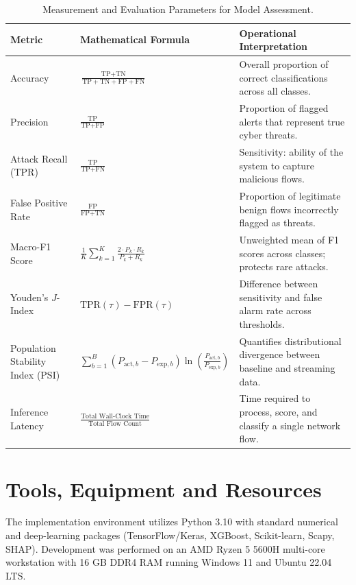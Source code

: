 \documentclass[12pt,a4paper]{report}
\begin{document}
\begin{table}[H]
\centering
\caption{Measurement and Evaluation Parameters for Model Assessment.}
\label{tab:eval_params}
\small
\setlength{\tabcolsep}{3pt}
\renewcommand{\arraystretch}{1.2}
\begin{tabularx}{\textwidth}{|P{0.18\textwidth}|P{0.28\textwidth}|Y|}
\hline
\textbf{Metric} & \textbf{Mathematical Formula} & \textbf{Operational Interpretation} \\
\hline
Accuracy & $\frac{\text{TP} + \text{TN}}{\text{TP} + \text{TN} + \text{FP} + \text{FN}}$ & Overall proportion of correct classifications across all classes. \\
\hline
Precision & $\frac{\text{TP}}{\text{TP} + \text{FP}}$ & Proportion of flagged alerts that represent true cyber threats. \\
\hline
Attack Recall (TPR) & $\frac{\text{TP}}{\text{TP} + \text{FN}}$ & Sensitivity: ability of the system to capture malicious flows. \\
\hline
False Positive Rate & $\frac{\text{FP}}{\text{FP} + \text{TN}}$ & Proportion of legitimate benign flows incorrectly flagged as threats. \\
\hline
Macro-F1 Score & $\frac{1}{K}\sum_{k=1}^K \frac{2 \cdot P_k \cdot R_k}{P_k + R_k}$ & Unweighted mean of F1 scores across classes; protects rare attacks. \\
\hline
Youden's $J$-Index & $\text{TPR}(\tau) - \text{FPR}(\tau)$ & Difference between sensitivity and false alarm rate across thresholds. \\
\hline
Population Stability Index (PSI) & $\sum_{b=1}^B (P_{\text{act}, b} - P_{\text{exp}, b})\ln\left(\frac{P_{\text{act}, b}}{P_{\text{exp}, b}}\right)$ & Quantifies distributional divergence between baseline and streaming data. \\
\hline
Inference Latency & $\frac{\text{Total Wall-Clock Time}}{\text{Total Flow Count}}$ & Time required to process, score, and classify a single network flow. \\
\hline
\end{tabularx}
\end{table}

\section{Tools, Equipment and Resources}
The implementation environment utilizes Python 3.10 with standard numerical and deep-learning packages (TensorFlow/Keras, XGBoost, Scikit-learn, Scapy, SHAP). Development was performed on an AMD Ryzen 5 5600H multi-core workstation with 16 GB DDR4 RAM running Windows 11 and Ubuntu 22.04 LTS.
\end{document}

